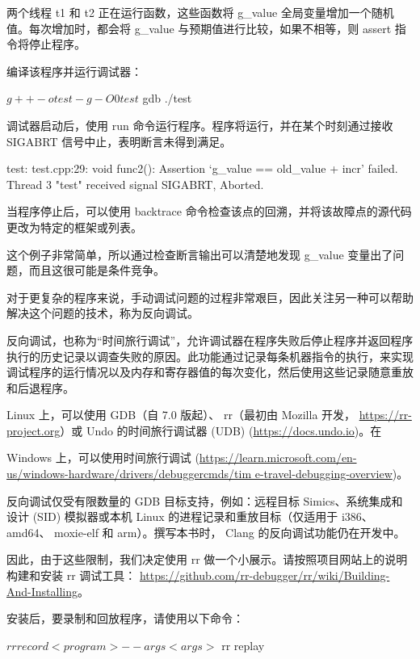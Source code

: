 两个线程 t1 和 t2 正在运行函数，这些函数将 g\_value 全局变量增加一个随机值。每次增加时，都会将 g\_value 与预期值进行比较，如果不相等，则 assert 指令将停止程序。

编译该程序并运行调试器：

\begin{shell}
$ g++ -o test -g -O0 test
$ gdb ./test
\end{shell}

调试器启动后，使用 run 命令运行程序。程序将运行，并在某个时刻通过接收 SIGABRT 信号中止，表明断言未得到满足。

\begin{shell}
test: test.cpp:29: void func2(): Assertion `g_value == old_value + incr' failed.
Thread 3 "test" received signal SIGABRT, Aborted.
\end{shell}

当程序停止后，可以使用 backtrace 命令检查该点的回溯，并将该故障点的源代码更改为特定的框架或列表。

这个例子非常简单，所以通过检查断言输出可以清楚地发现 g\_value 变量出了问题，而且这很可能是条件竞争。

对于更复杂的程序来说，手动调试问题的过程非常艰巨，因此关注另一种可以帮助解决这个问题的技术，称为反向调试。


反向调试，也称为“时间旅行调试”，允许调试器在程序失败后停止程序并返回程序执行的历史记录以调查失败的原因。此功能通过记录每条机器指令的执行，来实现调试程序的运行情况以及内存和寄存器值的每次变化，然后使用这些记录随意重放和后退程序。

Linux 上，可以使用 GDB（自 7.0 版起）、 rr（最初由 Mozilla 开发， \url{https://rr-project.org}）或 Undo 的时间旅行调试器 (UDB) (\url{https://docs.undo.io})。在

Windows 上，可以使用时间旅行调试 (\url{https://learn.microsoft.com/en-us/windows-hardware/drivers/debuggercmds/tim e-travel-debugging-overview})。

反向调试仅受有限数量的 GDB 目标支持，例如：远程目标 Simics、系统集成和设计 (SID) 模拟器或本机 Linux 的进程记录和重放目标（仅适用于 i386、 amd64、 moxie-elf 和 arm）。撰写本书时， Clang 的反向调试功能仍在开发中。

因此，由于这些限制，我们决定使用 rr 做一个小展示。请按照项目网站上的说明构建和安装 rr 调试工具： \url{https://github.com/rr-debugger/rr/wiki/Building-And-Installing}。

安装后，要录制和回放程序，请使用以下命令：

\begin{shell}
$ rr record <program> --args <args>
$ rr replay
\end{shell}

